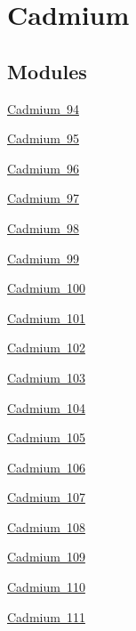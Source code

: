 \hypertarget{group___isotope_const-_cadmium}{}\section{Cadmium}
\label{group___isotope_const-_cadmium}
\subsection*{Modules}
\begin{DoxyCompactItemize}
\item 
\mbox{\hyperlink{group___isotope_const-_cadmium-_cd94}{Cadmium 94}}
\item 
\mbox{\hyperlink{group___isotope_const-_cadmium-_cd95}{Cadmium 95}}
\item 
\mbox{\hyperlink{group___isotope_const-_cadmium-_cd96}{Cadmium 96}}
\item 
\mbox{\hyperlink{group___isotope_const-_cadmium-_cd97}{Cadmium 97}}
\item 
\mbox{\hyperlink{group___isotope_const-_cadmium-_cd98}{Cadmium 98}}
\item 
\mbox{\hyperlink{group___isotope_const-_cadmium-_cd99}{Cadmium 99}}
\item 
\mbox{\hyperlink{group___isotope_const-_cadmium-_cd100}{Cadmium 100}}
\item 
\mbox{\hyperlink{group___isotope_const-_cadmium-_cd101}{Cadmium 101}}
\item 
\mbox{\hyperlink{group___isotope_const-_cadmium-_cd102}{Cadmium 102}}
\item 
\mbox{\hyperlink{group___isotope_const-_cadmium-_cd103}{Cadmium 103}}
\item 
\mbox{\hyperlink{group___isotope_const-_cadmium-_cd104}{Cadmium 104}}
\item 
\mbox{\hyperlink{group___isotope_const-_cadmium-_cd105}{Cadmium 105}}
\item 
\mbox{\hyperlink{group___isotope_const-_cadmium-_cd106}{Cadmium 106}}
\item 
\mbox{\hyperlink{group___isotope_const-_cadmium-_cd107}{Cadmium 107}}
\item 
\mbox{\hyperlink{group___isotope_const-_cadmium-_cd108}{Cadmium 108}}
\item 
\mbox{\hyperlink{group___isotope_const-_cadmium-_cd109}{Cadmium 109}}
\item 
\mbox{\hyperlink{group___isotope_const-_cadmium-_cd110}{Cadmium 110}}
\item 
\mbox{\hyperlink{group___isotope_const-_cadmium-_cd111}{Cadmium 111}}

\end{DoxyCompactItemize}
